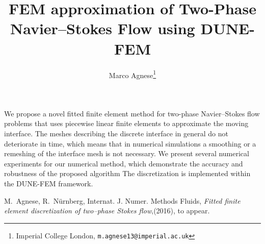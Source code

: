 \documentclass{article}
\begin{document}
\title{FEM approximation of Two-Phase Navier--Stokes Flow using DUNE-FEM}
\author{%
  Marco Agnese\thanks{Imperial College London,
    \texttt{m.agnese13@imperial.ac.uk}}
}
\maketitle

We propose a novel fitted finite element method for two-phase Navier--Stokes 
flow problems that uses piecewise linear finite elements to approximate the 
moving interface. The meshes describing the discrete interface in general do not 
deteriorate in time, which means that in numerical simulations a smoothing or a 
remeshing of the interface mesh is not necessary. 
We present several numerical experiments for our numerical method, which 
demonstrate the accuracy and robustness of the proposed algorithm
The discretization is implemented within the DUNE-FEM 
framework.
\begin{thebibliography}{10}

M.~Agnese, R.~N\"urnberg, Internat. J. Numer. Methods Fluids, 
\emph{ Fitted finite element discretization of two--phase Stokes flow},(2016), 
to appear.
\end{thebibliography}
\end{document}

